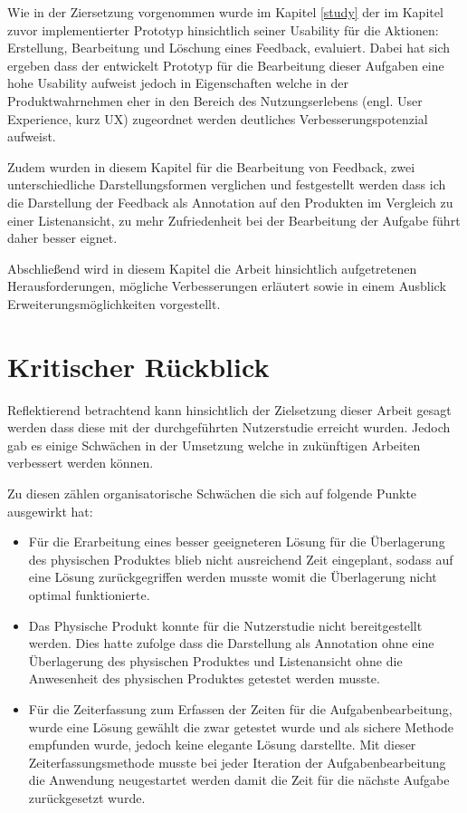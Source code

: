 Wie in der Ziersetzung vorgenommen wurde im Kapitel \ref{study} der im Kapitel zuvor implementierter Prototyp hinsichtlich seiner Usability für die Aktionen: Erstellung, Bearbeitung und Löschung eines
Feedback, evaluiert. Dabei hat sich ergeben dass der entwickelt Prototyp für die Bearbeitung dieser Aufgaben eine hohe Usability aufweist jedoch in Eigenschaften welche in der Produktwahrnehmen eher 
in den Bereich des Nutzungserlebens (engl. User Experience, kurz UX) zugeordnet werden deutliches Verbesserungspotenzial aufweist. 

Zudem wurden in diesem Kapitel für die Bearbeitung von Feedback, zwei unterschiedliche Darstellungsformen verglichen und festgestellt werden dass ich 
die Darstellung der Feedback als Annotation auf den Produkten im Vergleich zu einer Listenansicht, zu mehr Zufriedenheit bei der Bearbeitung der Aufgabe führt daher besser eignet. 

Abschließend wird in diesem Kapitel die Arbeit hinsichtlich aufgetretenen Herausforderungen, mögliche Verbesserungen erläutert sowie in einem Ausblick Erweiterungsmöglichkeiten vorgestellt.  

\section{Kritischer Rückblick}

Reflektierend betrachtend kann hinsichtlich der Zielsetzung dieser Arbeit gesagt werden dass diese mit der durchgeführten Nutzerstudie erreicht wurden.
Jedoch gab es einige Schwächen in der Umsetzung welche in zukünftigen Arbeiten verbessert werden können. 

Zu diesen zählen organisatorische Schwächen die sich auf folgende Punkte ausgewirkt hat:  

\begin{itemize}
\item{Für die Erarbeitung eines besser geeigneteren Lösung für die Überlagerung des physischen Produktes blieb nicht ausreichend Zeit eingeplant, sodass auf eine Lösung zurückgegriffen werden musste womit 
die Überlagerung nicht optimal funktionierte.} 

\item{Das Physische Produkt konnte für die Nutzerstudie nicht bereitgestellt werden. Dies hatte zufolge dass die Darstellung als Annotation ohne eine Überlagerung des physischen Produktes und Listenansicht ohne die Anwesenheit des physischen Produktes getestet werden musste.}
\item{Für die Zeiterfassung zum Erfassen der Zeiten für die Aufgabenbearbeitung, wurde eine Lösung gewählt die zwar getestet wurde und als sichere Methode empfunden wurde, jedoch 
keine elegante Lösung darstellte. Mit dieser Zeiterfassungsmethode musste bei jeder Iteration der Aufgabenbearbeitung die Anwendung neugestartet werden damit die Zeit für die nächste Aufgabe zurückgesetzt wurde.} 
\end{itemize}


